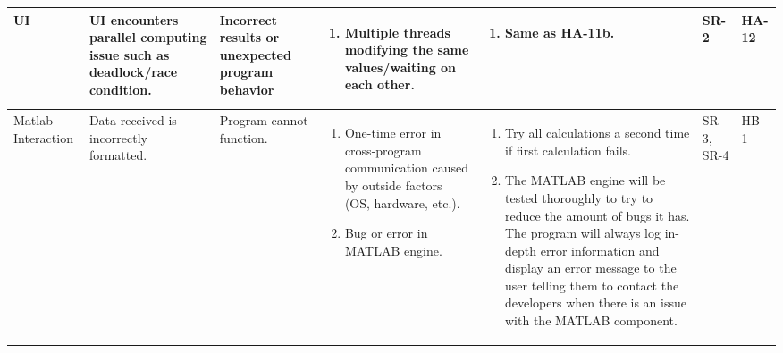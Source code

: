 \documentclass{article}
\begin{document}
\begin{landscape}
\begin{longtable}{|p{} | p{} | p{} | p{} | p{} | p{} | p{}|}
  \hline

  UI & UI encounters parallel computing issue such as deadlock/race condition. & 
  Incorrect results or unexpected program behavior &
  \begin{enumerate}[leftmargin=*, label={\alph*.}, itemsep=1pt, topsep=0pt, partopsep=0pt] 
    \item Multiple threads modifying the same values/waiting on each other.
  \end{enumerate} &
  \begin{enumerate}[leftmargin=*, label={\alph*.}, itemsep=1pt, topsep=0pt, partopsep=0pt] 
    \item Same as HA-11b.
  \end{enumerate} &
  SR-2 & HA-12 \\

  \hline

  Matlab Interaction & Data received is incorrectly formatted. & Program cannot function. & 
  \begin{enumerate}[leftmargin=*, label={\alph*.}, itemsep=1pt, topsep=0pt, partopsep=0pt] 
    \item One-time error in cross-program communication caused by outside factors (OS, hardware, etc.).
    \item Bug or error in MATLAB engine.
  \end{enumerate} &
  \begin{enumerate}[leftmargin=*, label={\alph*.}, itemsep=1pt, topsep=0pt, partopsep=0pt] 
    \item Try all calculations a second time if first calculation fails.
    \item The MATLAB engine will be tested thoroughly to try to reduce the amount of bugs it has. 
    The program will always log in-depth error information and display an error message to the user telling them to 
    contact the developers when there is an issue with the MATLAB component. 
  \end{enumerate} &
  SR-3, SR-4 & HB-1 \\

  \hline


\end{longtable}
\end{landscape}
\end{document}
